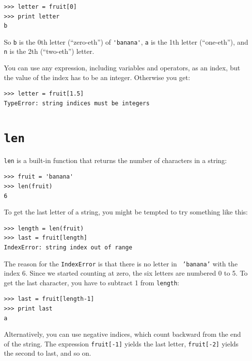 \documentclass[10pt]{book}
\begin{document}
\beforeverb
\begin{verbatim}
>>> letter = fruit[0]
>>> print letter
b
\end{verbatim}
\afterverb
%
So {\tt b} is the 0th letter (``zero-eth'') of \verb"'banana'", {\tt a}
is the 1th letter (``one-eth''), and {\tt n} is the 2th (``two-eth'')
letter.


You can use any expression, including variables and operators, as an
index, but the value of the index has to be an integer.  Otherwise you
get:


\beforeverb
\begin{verbatim}
>>> letter = fruit[1.5]
TypeError: string indices must be integers
\end{verbatim}
\afterverb
%

\section{{\tt len}}


{\tt len} is a built-in function that returns the number of characters
in a string:

\beforeverb
\begin{verbatim}
>>> fruit = 'banana'
>>> len(fruit)
6
\end{verbatim}
\afterverb
%
To get the last letter of a string, you might be tempted to try something
like this:


\beforeverb
\begin{verbatim}
>>> length = len(fruit)
>>> last = fruit[length]
IndexError: string index out of range
\end{verbatim}
\afterverb
%
The reason for the {\tt IndexError} is that there is no letter in {\tt
'banana'} with the index 6.  Since we started counting at zero, the
six letters are numbered 0 to 5.  To get the last character, you have
to subtract 1 from {\tt length}:

\beforeverb
\begin{verbatim}
>>> last = fruit[length-1]
>>> print last
a
\end{verbatim}
\afterverb
%
Alternatively, you can use negative indices, which count backward from
the end of the string.  The expression {\tt fruit[-1]} yields the last
letter, {\tt fruit[-2]} yields the second to last, and so on.
\end{document}

